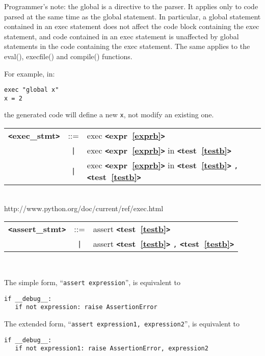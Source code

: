 \documentclass[12pt]{article}
\begin{document}
Programmer's note: the global is a directive to the parser. 
It applies only to code parsed at the same time as the global statement. 
In particular, a global statement contained in an exec statement does not 
affect the code block containing the exec statement, and code contained in 
an exec statement is unaffected by global statements in the code containing 
the exec statement. The same applies to the eval(), execfile() and compile() 
functions.

For example, in:
\begin{verbatim}
exec "global x"
x = 2
\end{verbatim}
the generated code will define a new \verb|x|, not modify an existing one.

\label{execzzzstmtb}
\begin{tabular}{lcl}
{\bf \verb+<+exec\_stmt\verb+>+} & ::=  & exec {\bf \verb+<+expr~\ref{exprb}\verb+>+}  \\
 & \verb+|+  & exec {\bf \verb+<+expr~\ref{exprb}\verb+>+}  in {\bf \verb+<+test~\ref{testb}\verb+>+}  \\
 & \verb+|+  & exec {\bf \verb+<+expr~\ref{exprb}\verb+>+}  in {\bf \verb+<+test~\ref{testb}\verb+>+}  \verb|,| {\bf \verb+<+test~\ref{testb}\verb+>+}  \\
\end{tabular} \\

http://www.python.org/doc/current/ref/exec.html

\label{assertzzzstmtb}
\begin{tabular}{lcl}
{\bf \verb+<+assert\_stmt\verb+>+} & ::=  & assert {\bf \verb+<+test~\ref{testb}\verb+>+}  \\
 & \verb+|+  & assert {\bf \verb+<+test~\ref{testb}\verb+>+}  \verb|,| {\bf \verb+<+test~\ref{testb}\verb+>+}  \\
\end{tabular} \\


The simple form, ``\verb|assert expression|'', is equivalent to 
\begin{verbatim}
if __debug__:
   if not expression: raise AssertionError
\end{verbatim}

 The extended form, ``\verb|assert expression1, expression2|'', is equivalent to 
\begin{verbatim}
if __debug__:
   if not expression1: raise AssertionError, expression2
\end{verbatim}
\end{document}
